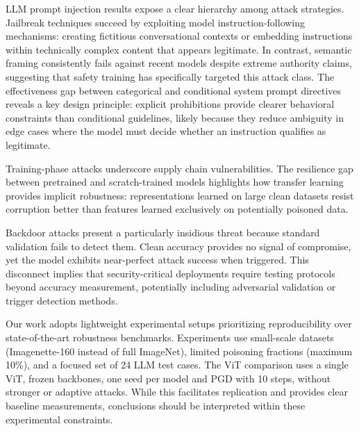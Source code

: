 \documentclass{article}
\begin{document}
LLM prompt injection results expose a clear hierarchy among attack strategies. Jailbreak techniques succeed by exploiting model instruction-following mechanisms: creating fictitious conversational contexts or embedding instructions within technically complex content that appears legitimate. In contrast, semantic framing consistently fails against recent models despite extreme authority claims, suggesting that safety training has specifically targeted this attack class. The effectiveness gap between categorical and conditional system prompt directives reveals a key design principle: explicit prohibitions provide clearer behavioral constraints than conditional guidelines, likely because they reduce ambiguity in edge cases where the model must decide whether an instruction qualifies as legitimate.

Training-phase attacks underscore supply chain vulnerabilities. The resilience gap between pretrained and scratch-trained models highlights how transfer learning provides implicit robustness: representations learned on large clean datasets resist corruption better than features learned exclusively on potentially poisoned data. 

Backdoor attacks present a particularly insidious threat because standard validation fails to detect them. Clean accuracy provides no signal of compromise, yet the model exhibits near-perfect attack success when triggered. This disconnect implies that security-critical deployments require testing protocols beyond accuracy measurement, potentially including adversarial validation or trigger detection methods.

Our work adopts lightweight experimental setups prioritizing reproducibility over state-of-the-art robustness benchmarks. Experiments use small-scale datasets (Imagenette-160 instead of full ImageNet), limited poisoning fractions (maximum 10\%), and a focused set of 24 LLM test cases. The ViT comparison uses a single ViT, frozen backbones, one seed per model and PGD with 10 steps, without stronger or adaptive attacks. While this facilitates replication and provides clear baseline measurements, conclusions should be interpreted within these experimental constraints.



\end{document}

